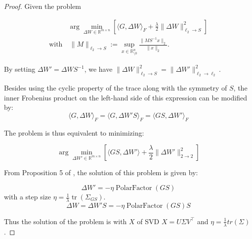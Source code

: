     \begin{proof}
    Given the problem 
    
        \begin{equation}
        \begin{aligned}
            & \arg \min_{\Delta W \in \mathbb{R}^{m \times n}} \left[  \langle G, \Delta W \rangle_F + \frac{\lambda}{2} \| \Delta W \|_{\ell_2 \rightarrow S}^2 \right] \\
             \text{with} & \ \| M \|_{\ell_2 \rightarrow S} := \sup_{x \in \mathbb{R}^{n}_{\setminus 0}} \frac{\| M S^{-1} x \|_2}{\| x\|_2}.
        \end{aligned}
        \end{equation}

    By setting $\Delta W' = \Delta W S^{-1}$, we have 
$\| \Delta W \|_{\ell_2 \rightarrow S}^2 = \| \Delta W' \|_{\ell_2 \rightarrow \ell_2}^2$.

Besides using the cyclic property of the trace along with the symmetry of $S$, the inner Frobenius product on the left-hand side of this expression can be modified by:
    \begin{equation}
    \label{eq:frobprod}
    \langle G, \Delta W  \rangle_F = \langle G, \Delta W' S  \rangle_F = \langle G S, \Delta W' \rangle_F
    \end{equation}

    The problem is thus equivalent to minimizing:
    
    \begin{equation}
        \arg \min_{\Delta W' \in \mathbb{R}^{m \times n}} \left[ \langle GS, \Delta W' \rangle + \frac{\lambda}{2} \| \Delta W'\|_{2 \rightarrow 2}^2 \right] 
    \end{equation}
    
    From Proposition 5 of \cite{bernstein2024oldoptimizernewnorm}, the solution of this problem is given by:
    
    
    \begin{equation}
       \Delta W' = - \eta \operatorname{PolarFactor}(GS)
    \end{equation}
    with a step size $\eta = \frac{1}{\lambda} \operatorname{tr}(\Sigma_{GS})$.
    \begin{equation}
       \Delta W = \Delta W' S= - \eta \operatorname{PolarFactor}(GS) S
    \end{equation}

\iffalse
Thus the solution of the problem is 
    \noindent with $X$ of SVD $X = U \Sigma V^\top$ and $\eta = \frac{1}{\lambda} tr (\Sigma)$.
    

\end{proof}
